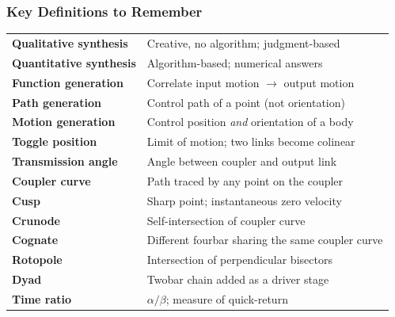 \documentclass[10pt,aspectratio=43]{beamer}
\begin{document}
\begin{frame}
\frametitle{Key Definitions to Remember}

\begin{yellowbox}
\small
\begin{tabular}{@{}p{3.2cm}p{7.3cm}@{}}
\textbf{Qualitative synthesis} & Creative, no algorithm; judgment-based \\
\textbf{Quantitative synthesis} & Algorithm-based; numerical answers \\
\textbf{Function generation} & Correlate input motion $\to$ output motion \\
\textbf{Path generation} & Control path of a point (not orientation) \\
\textbf{Motion generation} & Control position \emph{and} orientation of a body \\
\textbf{Toggle position} & Limit of motion; two links become colinear \\
\textbf{Transmission angle} & Angle between coupler and output link \\
\textbf{Coupler curve} & Path traced by any point on the coupler \\
\textbf{Cusp} & Sharp point; instantaneous zero velocity \\
\textbf{Crunode} & Self-intersection of coupler curve \\
\textbf{Cognate} & Different fourbar sharing the same coupler curve \\
\textbf{Rotopole} & Intersection of perpendicular bisectors \\
\textbf{Dyad} & Twobar chain added as a driver stage \\
\textbf{Time ratio} & $\alpha/\beta$; measure of quick-return \\
\end{tabular}
\end{yellowbox}
\end{frame}
\end{document}
